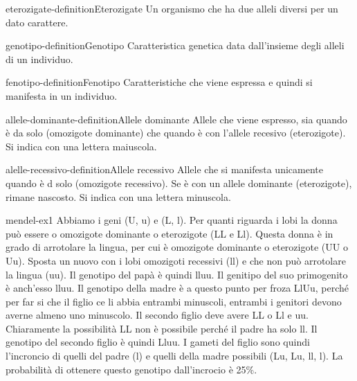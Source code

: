 \documentclass[preview]{standalone}
\begin{document}
\begin{snippetdefinition}{eterozigate-definition}{Eterozigate}
    Un organismo che ha due alleli diversi per un dato carattere.
\end{snippetdefinition}

\begin{snippetdefinition}{genotipo-definition}{Genotipo}
    Caratteristica genetica data dall'insieme degli alleli di un individuo.
\end{snippetdefinition}

\begin{snippetdefinition}{fenotipo-definition}{Fenotipo}
    Caratteristiche che viene espressa e quindi si manifesta in un individuo.
\end{snippetdefinition}

\begin{snippetdefinition}{allele-dominante-definition}{Allele dominante}
    Allele che viene espresso, sia quando è da solo (omozigote dominante) che
    quando è con l'allele recesivo (eterozigote). Si indica con una lettera maiuscola.
\end{snippetdefinition}

\begin{snippetdefinition}{alelle-recessivo-definition}{Allele recessivo}
    Allele che si manifesta unicamente quando è d solo (omozigote recessivo).
    Se è con un allele dominante (eterozigote), rimane nascosto. Si indica con una lettera minuscola.
\end{snippetdefinition}


\begin{snippetexercise}{mendel-ex1}{}
    Abbiamo i geni (U, u) e (L, l).
    Per quanti riguarda i lobi la donna può essere o omozigote dominante o eterozigote
    (LL e Ll). Questa donna è in grado di arrotolare la lingua, per cui è
    omozigote dominante o eterozigote (UU o Uu).
    Sposta un nuovo con i lobi omozigoti recessivi (ll) e che non può arrotolare la lingua
    (uu). Il genotipo del papà è quindi lluu. Il genitipo del suo primogenito 
    è anch'esso lluu.
    Il genotipo della madre è a questo punto per froza LlUu, perché
    per far si che il figlio ce li abbia entrambi minuscoli, entrambi
    i genitori devono averne almeno uno minuscolo.
    Il secondo figlio deve avere LL o Ll e uu. Chiaramente la possibilità
    LL non è possibile perché il padre ha solo ll.
    Il genotipo del secondo figlio è quindi Lluu.
    I gameti del figlio sono quindi l'incroncio di quelli del padre (l)
    e quelli della madre possibili (Lu, Lu, ll, l).
    La probabilità di ottenere questo genotipo dall'incrocio è 25\%.
\end{snippetexercise}
\end{document}
